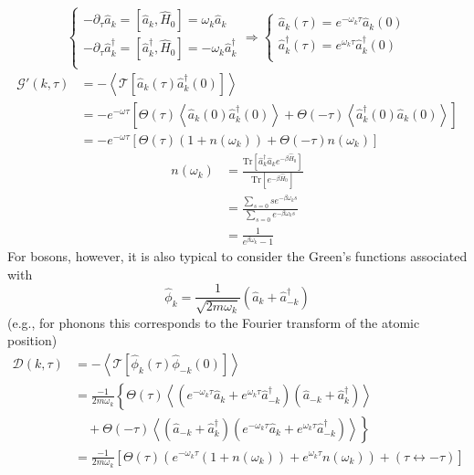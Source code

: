 \[ \begin{cases}
	-\partial _{\tau}\hat{a}_k=\left[ \hat{a}_k,\hat{H}_0 \right] =\omega _k\hat{a}_k\\
	-\partial _{\tau}\hat{a}_{k}^{\dagger}=\left[ \hat{a}_{k}^{\dagger},\hat{H}_0 \right] =-\omega _k\hat{a}_{k}^{\dagger}\\
\end{cases}\Rightarrow \begin{cases}
	\hat{a}_k\left( \tau \right) =e^{-\omega _k\tau}\hat{a}_k\left( 0 \right)\\
	\hat{a}_{k}^{\dagger}\left( \tau \right) =e^{\omega _k\tau}\hat{a}_{k}^{\dagger}\left( 0 \right)\\
\end{cases}\]
\begin{align*}
    \mathcal{G} '\left( k,\tau \right) &=-\left< \mathcal{T} \left[ \hat{a}_k\left( \tau \right) \hat{a}_{k}^{\dagger}\left( 0 \right) \right] \right> \\
    &=-e^{-\omega \tau}\left[ \Theta \left( \tau \right) \left< \hat{a}_k\left( 0 \right) \hat{a}_{k}^{\dagger}\left( 0 \right) \right> +\Theta \left( -\tau \right) \left< \hat{a}_{k}^{\dagger}\left( 0 \right) \hat{a}_k\left( 0 \right) \right> \right] \\
    &=-e^{-\omega \tau}\left[ \Theta \left( \tau \right) \left( 1+n\left( \omega _k \right) \right) +\Theta \left( -\tau \right) n\left( \omega _k \right) \right]
\end{align*}
\begin{align*}
    n\left( \omega _k \right) &=\frac{\mathrm{Tr}\left[ \hat{a}_{k}^{\dagger}\hat{a}_ke^{-\beta \hat{H}_0} \right]}{\mathrm{Tr}\left[ e^{-\beta \hat{H}_0} \right]}\\
    &=\frac{\sum_{s=0}{se^{-\beta \omega _ks}}}{\sum_{s=0}{e^{-\beta \omega _ks}}}\\
    &=\frac{1}{e^{\beta \omega _k}-1}
\end{align*}
For bosons, however, it is also typical to consider the Green's functions associated with
\[ \hat{\phi}_k=\frac{1}{\sqrt{2m\omega _k}}\left( \hat{a}_k+\hat{a}_{-k}^{\dagger} \right) \]
(e.g., for phonons this corresponds to the Fourier transform of the atomic position)
\begin{align*}
    \mathscr{D} \left( k,\tau \right) &=-\left< \mathcal{T} \left[ \hat{\phi}_k\left( \tau \right) \hat{\phi}_{-k}\left( 0 \right) \right] \right> \\
    &=\frac{-1}{2m\omega _k}\left\{ \Theta \left( \tau \right) \left< \left( e^{-\omega _k\tau}\hat{a}_k+e^{\omega _k\tau}\hat{a}_{-k}^{\dagger} \right) \left( \hat{a}_{-k}+\hat{a}_{k}^{\dagger} \right) \right> \right. \\
    &\quad +\left. \Theta \left( -\tau \right) \left< \left( \hat{a}_{-k}+\hat{a}_{k}^{\dagger} \right) \left( e^{-\omega _k\tau}\hat{a}_k+e^{\omega _k\tau}\hat{a}_{-k}^{\dagger} \right) \right> \right\} \\
    &=\frac{-1}{2m\omega _k}\left[ \Theta \left( \tau \right) \left( e^{-\omega _k\tau}\left( 1+n\left( \omega _k \right) \right) +e^{\omega _k\tau}n\left( \omega _k \right) \right) +\left( \tau \leftrightarrow -\tau \right) \right]
\end{align*}
